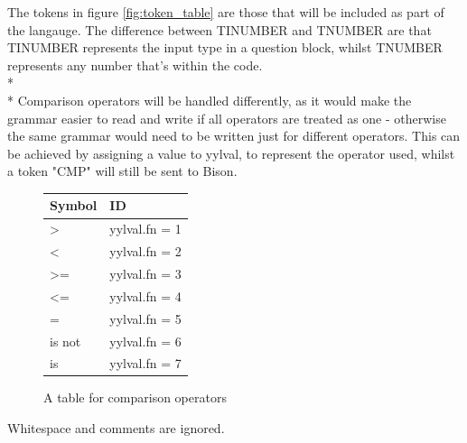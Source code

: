 \documentclass[12pt]{report}
\begin{document}
The tokens in figure \ref{fig:token_table} are those that will be included as part of the langauge.  The difference between TINUMBER and TNUMBER are that TINUMBER represents the input type in a question block, whilst TNUMBER represents any number that's within the code.\\*
\\*
Comparison operators will be handled differently, as it would make the grammar easier to read and write if all operators are treated as one - otherwise the same grammar would need to be written just for different operators.  This can be achieved by assigning a value to yylval, to represent the operator used, whilst a token "CMP" will still be sent to Bison.\\
\begin{figure}[H]
	\begin{center}
		\begin{tabular}{ | l | l | }
		\hline
		\textbf{Symbol} & \textbf{ID} \\ \hline
		\textgreater & yylval.fn = 1 \\ \hline
		\textless & yylval.fn = 2 \\ \hline
		\textgreater = & yylval.fn = 3 \\ \hline
		\textless = & yylval.fn = 4 \\ \hline
		= & yylval.fn = 5 \\ \hline
		is not & yylval.fn = 6 \\ \hline
		is & yylval.fn = 7 \\ \hline
		\end{tabular}
		\caption{A table for comparison operators}\label{fig:cmp_table}
	\end{center}
\end{figure}
Whitespace and comments are ignored.
\end{document}
